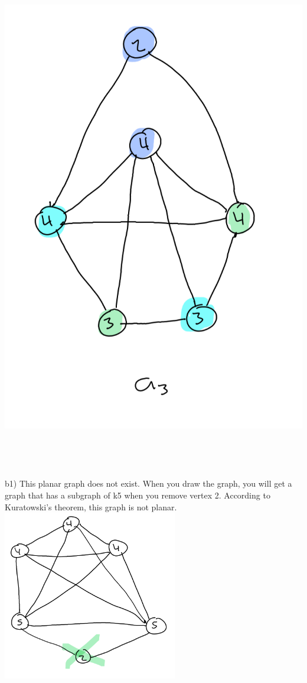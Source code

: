 \documentclass{article}
\begin{document}
\begin{solution}
	\\ \includegraphics[scale=0.5]{a3.png}
	\\\\\\\\\\
	b1) 
	This planar graph does not exist. When you draw the graph, you will get a graph that has a subgraph of k5 when you remove vertex 2. According to Kuratowski's theorem, this graph is not planar.
	\\ \includegraphics[width=3in]{b1.png}

\end{solution}
\end{document}
